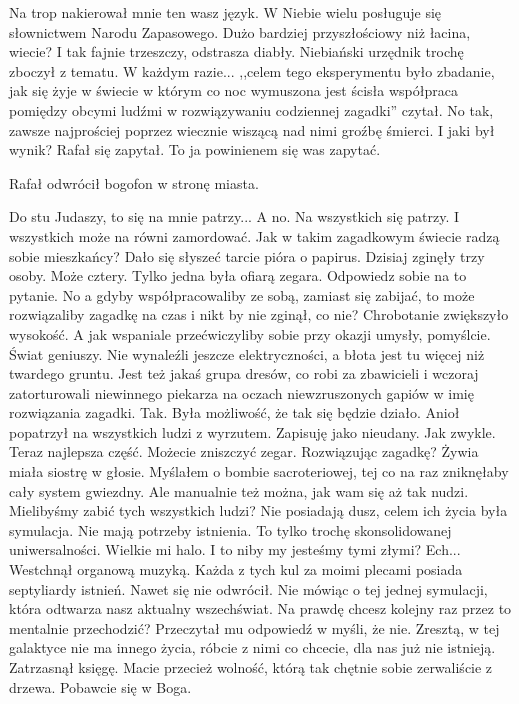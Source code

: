 \begin{dialogue}
	\ds{} Na trop nakierował mnie ten wasz język. W Niebie wielu posługuje się słownictwem Narodu Zapasowego. Dużo bardziej przyszłościowy niż łacina, wiecie? I tak fajnie trzeszczy, odstrasza diabły.
		\dm{} Niebiański urzędnik trochę zboczył z tematu.
		\dm{} W każdym razie... ,,celem tego eksperymentu było zbadanie, jak się żyje w świecie w którym co noc wymuszona jest ścisła współpraca pomiędzy obcymi ludźmi w rozwiązywaniu codziennej zagadki''
		\dm{} czytał.
		\dm{} No tak, zawsze najprościej poprzez wiecznie wiszącą nad nimi groźbę śmierci.
	\ds{} I jaki był wynik? 
		\dm{} Rafał się zapytał.
	\ds{} To ja powinienem się was zapytać.
\end{dialogue}
Rafał odwrócił bogofon w stronę miasta.
\begin{dialogue}
	\ds{} Do stu Judaszy, to się na mnie patrzy...
	\ds{} A no. Na wszystkich się patrzy. I wszystkich może na równi zamordować.
	\ds{} Jak w takim zagadkowym świecie radzą sobie mieszkańcy? 
		\dm{} Dało się słyszeć tarcie pióra o papirus.
	\ds{} Dzisiaj zginęły trzy osoby. Może cztery. Tylko jedna była ofiarą zegara. Odpowiedz sobie na to pytanie.
	\ds{} No a gdyby współpracowaliby ze sobą, zamiast się zabijać, to może rozwiązaliby zagadkę na czas i nikt by nie zginął, co nie?
		\dm{} Chrobotanie zwiększyło wysokość. \dm{} A jak wspaniale przećwiczyliby sobie przy okazji umysły, pomyślcie. Świat geniuszy.
	\ds{} Nie wynaleźli jeszcze elektryczności, a błota jest tu więcej niż twardego gruntu. Jest też jakaś grupa dresów, co robi za zbawicieli i wczoraj zatorturowali niewinnego piekarza na oczach niewzruszonych gapiów w imię rozwiązania zagadki.
	\ds{} Tak. Była możliwość, że tak się będzie działo. \dm{} Anioł popatrzył na wszystkich ludzi z wyrzutem. \dm{} Zapisuję jako nieudany. Jak zwykle. Teraz najlepsza część. Możecie zniszczyć zegar.
	\ds{} Rozwiązując zagadkę?
		\dm{} Żywia miała siostrę w głosie.
	\ds{} Myślałem o bombie sacroteriowej, tej co na raz zniknęłaby cały system gwiezdny. Ale manualnie też można, jak wam się aż tak nudzi.
	\ds{} Mielibyśmy zabić tych wszystkich ludzi?
	\ds{} Nie posiadają dusz, celem ich życia była symulacja. Nie mają potrzeby istnienia. To tylko trochę skonsolidowanej uniwersalności. Wielkie mi halo.
	\ds{} I to niby my jesteśmy tymi złymi?
	\ds{} Ech... 
		\dm{} Westchnął organową muzyką.
		\dm{} Każda z tych kul za moimi plecami posiada septyliardy istnień. 
		\dm{} Nawet się nie odwrócił. 
		\dm{} Nie mówiąc o tej jednej symulacji, która odtwarza nasz aktualny wszechświat. Na prawdę chcesz kolejny raz przez to mentalnie przechodzić?
		\dm{} Przeczytał mu odpowiedź w myśli, że nie.
		\dm{} Zresztą, w tej galaktyce nie ma innego życia, róbcie z nimi co chcecie, dla nas już nie istnieją.
		\dm{} Zatrzasnął księgę. 
		\dm{} Macie przecież wolność, którą tak chętnie sobie zerwaliście z drzewa. Pobawcie się w Boga.
\end{dialogue}

